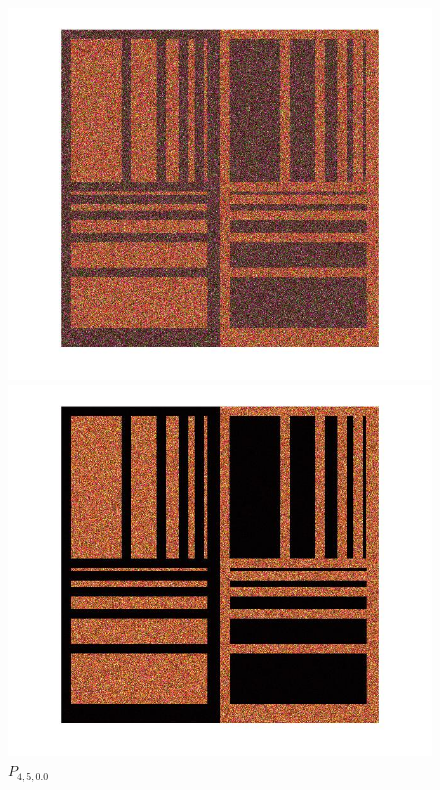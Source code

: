 \documentclass[12pt,a4paper]{article}
\begin{document}
\begin{figure}[!htb]
  \includegraphics[width=\linewidth]{Eq_Phantom_0p000_3_5_1.jpg}
	\caption{$P_{3,5,0.0}$}\label{fig:awesome_image1}
\endminipage\hfill
{}
  \includegraphics[width=\linewidth]{Eq_Phantom_0p000_4_5_1.jpg}
	\caption{$P_{4,5,0.0}$}\label{fig:awesome_image1}
\endminipage\hfill
\end{figure}
\end{document}
